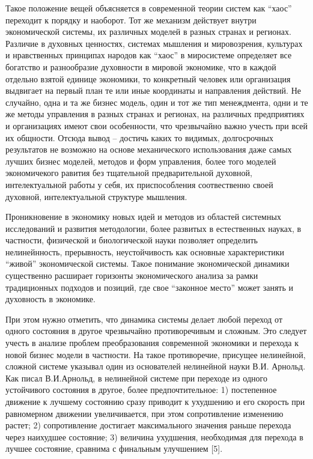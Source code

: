Такое положение вещей объясняется в современной теории систем как
``хаос'' переходит к порядку и наоборот. Тот же механизм действует
внутри экономической системы, их различных моделей в разных странах и
регионах. Различие в духовных ценностях, системах мышления и
мировозрения, культурах и нравственных принципах народов как ``хаос'' в
миросистеме определяет все богатство и разнообразие духовности в мировой
экономике, что в каждой отдельно взятой единице экономики, то конкретный
человек или организация выдвигает на первый план те или иные координаты
и направления действий. Не случайно, одна и та же бизнес модель, один и
тот же тип менеждмента, одни и те же методы управления в разных странах
и регионах, на различных предприятиях и организациях имеют свои
особенности, что чрезвычайно важно учесть при всей их общности. Отсюда
вывод -- достичь каких то видимых, долгосрочных результатов не возможно
на основе механического использования даже самых лучших бизнес моделей,
методов и форм управления, более того моделей экономичекого равития без
тщательной предварительной духовной, интелектуальной работы у себя, их
приспособления соотвественно своей духовной, интелектуальной структуре
мышления.

Проникновение в экономику новых идей и методов из областей системных
исследований и развития методологии, более развитых в естественных
науках, в частности, физической и биологической науки позволяет
определить нелинейнность, прерывность, неустойчивость как основные
характеристики ``живой'' экономической системы. Такое понимание
экономической динамики существенно расширает горизонты экономического
анализа за рамки традиционных подходов и позиций, где свое ``законное
место'' может занять и духовность в экономике.

При этом нужно отметить, что динамика системы делает любой переход от
одного состояния в другое чрезвычайно противоречивым и сложным. Это
следует учесть в анализе проблем преобразования современной экономики и
перехода к новой бизнес модели в частности. На такое противоречие,
присущее нелинейной, сложной системе указывал один из основателей
нелинейной науки В.И. Арнольд. Как писал В.И.Арнольд, в нелинейной
системе при переходе из одного устойчивого состояния в другое, более
предпочтительное: 1) постепенное движение к лучшему состоянию сразу
приводит к ухудшению и его скорость при равномерном движении
увеличивается, при этом сопротивление изменению растет; 2) сопротивление
достигает максимального значения раньше перехода через наихудшее
состояние; 3) величина ухудшения, необходимая для перехода в лучшее
состояние, сравнима с финальным улучшением {[}5{]}.

